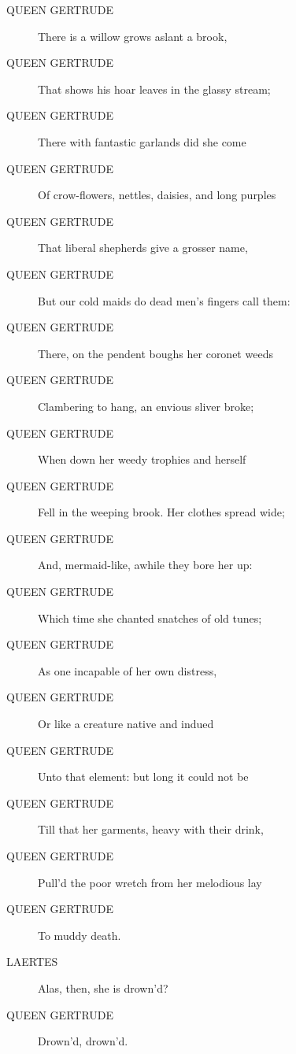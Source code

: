 \documentclass{article}
\begin{document}
\begin{description}
            
\item[QUEEN GERTRUDE] There is a willow grows aslant a brook,
\item[QUEEN GERTRUDE] That shows his hoar leaves in the glassy stream;
\item[QUEEN GERTRUDE] There with fantastic garlands did she come
\item[QUEEN GERTRUDE] Of crow-flowers, nettles, daisies, and long purples
\item[QUEEN GERTRUDE] That liberal shepherds give a grosser name,
\item[QUEEN GERTRUDE] But our cold maids do dead men's fingers call them:
\item[QUEEN GERTRUDE] There, on the pendent boughs her coronet weeds
\item[QUEEN GERTRUDE] Clambering to hang, an envious sliver broke;
\item[QUEEN GERTRUDE] When down her weedy trophies and herself
\item[QUEEN GERTRUDE] Fell in the weeping brook. Her clothes spread wide;
\item[QUEEN GERTRUDE] And, mermaid-like, awhile they bore her up:
\item[QUEEN GERTRUDE] Which time she chanted snatches of old tunes;
\item[QUEEN GERTRUDE] As one incapable of her own distress,
\item[QUEEN GERTRUDE] Or like a creature native and indued
\item[QUEEN GERTRUDE] Unto that element: but long it could not be
\item[QUEEN GERTRUDE] Till that her garments, heavy with their drink,
\item[QUEEN GERTRUDE] Pull'd the poor wretch from her melodious lay
\item[QUEEN GERTRUDE] To muddy death.
\end{description}
          
\begin{description}
            
\item[LAERTES] Alas, then, she is drown'd?
\end{description}
          
\begin{description}
            
\item[QUEEN GERTRUDE] Drown'd, drown'd.
\end{description}
          
\end{document}
